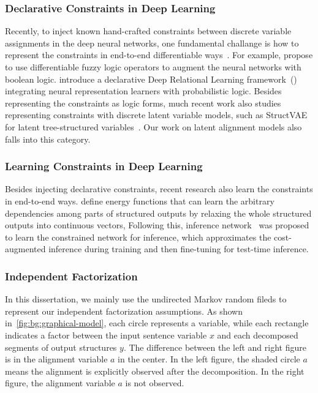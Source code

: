 \subsubsection{Declarative Constraints in Deep Learning}
\label{sssec:bg:def-constraints}
Recently, to inject known hand-crafted constraints between discrete
variable assignments in the deep neural networks, one fundamental
challange is how to represent the constraints in end-to-end
differentiable ways~\citep{bach2017hinge}. For example,
\citet{li2019augmenting} propose to use differentiable fuzzy logic
operators to augment the neural networks with boolean
logic. \citet{pacheco2021modeling} introduce a declarative Deep
Relational Learning framework~(\DRAIL) integrating neural
representation learners with probabilistic logic. Besides representing
the constraints as logic forms, much recent work also studies
representing constraints with discrete latent variable models, such as
StructVAE for latent tree-structured
variables~\citep{yin2018structvae, corro2019learning}. Our work on
latent alignment models also falls into this category.

\subsubsection{Learning Constraints in Deep Learning}
\label{sssec:bg:learning-constraints}
Besides injecting declarative constraints, recent research also learn
the constraints in end-to-end
ways. \citet[SPEN,][]{belanger2016structured} define energy functions
that can learn the arbitrary dependencies among parts of structured
outputs by relaxing the whole structured outputs into continuous
vectors, Following this, inference network~\citep{tu2018learning} was
proposed to learn the constrained network for inference, which
approximates the cost-augmented inference during training and then
fine-tuning for test-time inference.

\subsubsection{Independent Factorization}
\label{sssec:bg:ind-factorization}
In this dissertation, we mainly use the undirected Markov random fileds to
represent our independent factorization assumptions. As shown
in~\autoref{fig:bg:graphical-model}, each circle represents a
variable, while each rectangle indicates a factor between the input
sentence variable $x$ and each decomposed segments of output
structures $y$. The difference between the left and right figure is in
the alignment variable $a$ in the center. In the left figure, the
shaded circle $a$ means the alignment is explicitly observed after the
decomposition. In the right figure, the alignment variable $a$ is not
observed.


